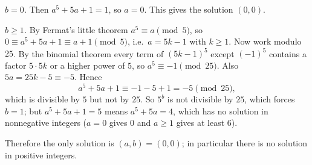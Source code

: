 \emph{$b=0$.} Then $a^5+5a+1=1$, so $a=0$. This gives the solution $(0,0)$.

\emph{$b\ge1$.} By Fermat's little theorem $a^5\equiv a\pmod5$, so $0\equiv a^5+5a+1\equiv a+1\pmod5$, i.e.\ $a=5k-1$ with $k\ge1$. Now work modulo $25$. By the binomial theorem every term of $(5k-1)^5$ except $(-1)^5$ contains a factor $5\cdot5k$ or a higher power of $5$, so $a^5\equiv-1\pmod{25}$. Also $5a=25k-5\equiv-5$. Hence
\[
a^5+5a+1\equiv-1-5+1=-5\pmod{25},
\]
which is divisible by $5$ but not by $25$. So $5^b$ is not divisible by $25$, which forces $b=1$; but $a^5+5a+1=5$ means $a^5+5a=4$, which has no solution in nonnegative integers ($a=0$ gives $0$ and $a\ge1$ gives at least $6$).

Therefore the only solution is $\boxed{(a,b)=(0,0)}$; in particular there is no solution in positive integers.
